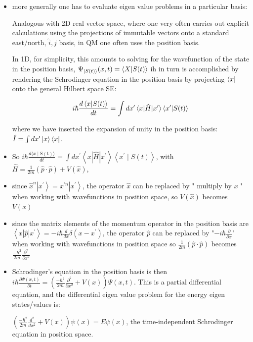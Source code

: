 \documentclass{article}
\begin{document}
\begin{itemize}
    \item more generally one has to evaluate eigen value problems in a particular basis:
    
    Analogous with 2D real vector space, where one very often carries out explicit calculations using the projections of immutable vectors onto a standard east/north, $\hat{i}, \hat{j}$ basis, in QM one often uses the position basis. 
    
    In 1D, for simplicity, this amounts to solving for the wavefunction of the state in the position basis, $\Psi_{\ket{S(t)}}(x,t) = \braket{X|S(t)}$ ih in turn is accomplished by rendering the Schrodinger equation in the position basis by projecting $\bra{x}$ onto the general Hilbert space SE:

$$i \hbar \frac{d \braket{x|S(t)}}{dt} = \int dx' \braket{x|\hat{H}|x'} \braket{x'|S(t)}$$

    where we have inserted the expansion of unity in the position basis: $\hat{I} = \int dx' \ket{x} \bra{x}$. 

    \item So $i \hbar \frac{d\langle x \mid \mathrm{S}(\mathrm{t})\rangle}{d t}=\int d x^{\prime}\left\langle x|\widehat{H}| x^{\prime}\right\rangle\left\langle x^{\prime} \mid S(t)\right\rangle$, with $\widehat{H}=\frac{1}{2 m}(\hat{p} \cdot \hat{p})+V(\hat{x})$,
    \item since $\hat{x}^{n}\left|x^{\prime}\right\rangle=x^{\prime n}\left|x^{\prime}\right\rangle$, the operator $\hat{x}$ can be replaced by " multiply by $x$ " when working with wavefunctions in position space, so $V(\hat{x})$ becomes $V(x)$
    \item since the matrix elements of the momentum operator in the position basis are $\left\langle x|\hat{p}| x^{\prime}\right\rangle=-i \hbar \frac{d}{d x} \delta\left(x-x^{\prime}\right)$, the operator $\hat{p}$ can be replaced by "$-i \hbar \frac{\partial}{\partial x}$" when working with wavefunctions in position space so $\frac{1}{2 m}(\hat{p} \cdot \hat{p})$ becomes $\frac{-\hbar^{2}}{2 m} \frac{\partial^{2}}{\partial x^{2}}$
    \item Schrodinger's equation in the position basis is then $i \hbar \frac{\partial \Psi(x, t)}{\partial t}=\left(\frac{-\hbar^{2}}{2 m} \frac{\partial^{2}}{\partial x^{2}}+V(x)\right) \Psi(x, t) .$ This is a partial differential equation, and the differential eigen value problem for the energy eigen states/values is:
    
    $\left(\frac{-\hbar^{2}}{2 m} \frac{d^{2}}{d x^{2}}+V(x)\right) \psi(x)=E \psi(x)$, the time-independent Schrodinger equation in position space.
    

\end{itemize}
\end{document}
